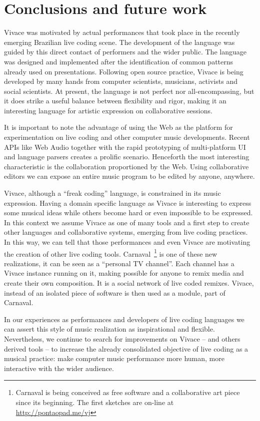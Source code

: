 \documentclass[letterpaper, 12pt]{article}
\begin{document}
{\section{Conclusions and future work}

Vivace was motivated by actual performances that took place in the
recently emerging Brazilian live coding scene. The development of the
language was guided by this direct contact of performers and the wider
public. The language was designed and implemented after the
identification of common patterns already used on
presentations. Following open source practice, Vivace is being
developed by many hands from computer scientists, musicians, activists
and social scientists. At present, the language is not perfect nor
all-encompassing, but it does strike a useful balance between
flexibility and rigor, making it an interesting language for artistic
expression on collaborative sessions.

It is important to note the advantage of using the Web as the platform
for experimentation on live coding and other computer music
developments. Recent APIs like Web Audio together with the rapid
prototyping of multi-platform UI and language parsers creates a
prolific scenario. Henceforth the most interesting characteristic is
the collaboration proportioned by the Web. Using collaborative editors
we can expose an entire music program to be edited by anyone,
anywhere.

Vivace, although a ``freak coding'' language, is constrained in its
music expression. Having a domain specific language as Vivace is
interesting to express some musical ideas while others become hard or
even impossible to be expressed. In this context we assume Vivace as
one of many tools and a first step to create other languages and
collaborative systems, emerging from live coding practices. In this
way, we can tell that those performances and even Vivace are
motivating the creation of other live coding
tools. Carnaval~\footnote{Carnaval is being conceived as free software
  and a collaborative art piece since its beginning. The first
  sketches are on-line at \url{http://pontaopad.me/vj}} is one of
these new realizations, it can be seen as a ``personal TV
channel''. Each channel has a Vivace instance running on it, making
possible for anyone to remix media and create their own
composition. It is a social network of live coded remixes. Vivace,
instead of an isolated piece of software is then used as a module,
part of Carnaval.

In our experiences as performances and developers of live coding
languages we can assert this style of music realization as
inspirational and flexible. Nevertheless, we continue to search for
improvements on Vivace -- and others derived tools -- to increase the
already consolidated objective of live coding as a musical practice:
make computer music performance more human, more interactive with the
wider audience.

}
\end{document}
